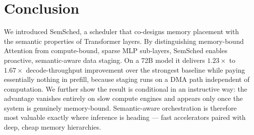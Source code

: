 \documentclass[10pt,conference,letterpaper]{IEEEtran}
\begin{document}
\section{Conclusion}
\label{sec:conclusion}
\noindent
We introduced SemSched, a scheduler that co-designs memory placement with the semantic properties of Transformer layers. By distinguishing memory-bound Attention from compute-bound, sparse MLP sub-layers, SemSched enables proactive, semantic-aware data staging. On a 72B model it delivers $1.23\times$ to $1.67\times$ decode-throughput improvement over the strongest baseline while paying essentially nothing in prefill, because staging runs on a DMA path independent of computation. We further show the result is conditional in an instructive way: the advantage vanishes entirely on slow compute engines and appears only once the system is genuinely memory-bound. Semantic-aware orchestration is therefore most valuable exactly where inference is heading --- fast accelerators paired with deep, cheap memory hierarchies.


\end{document}

